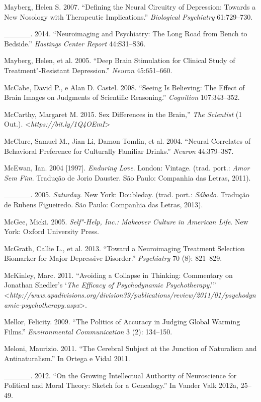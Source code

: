{\begin{Parskip}
Mayberg, Helen S. 2007. ``Defining the Neural Circuitry of Depression:
Towards a New Nosology with Therapeutic Implications.'' \emph{Biological
Psychiatry} 61:729--730.

\_\_\_\_\_. 2014. ``Neuroimaging and Psychiatry: The Long Road from Bench
to Bedside.'' \emph{Hastings Center Report} 44:S31--S36.

Mayberg, Helen, et al. 2005. ``Deep Brain Stimulation for Clinical Study
of Treatment"-Resistant Depression.'' \emph{Neuron} 45:651--660.

McCabe, David P., e Alan D. Castel. 2008. ``Seeing Is Believing: The
Effect of Brain Images on Judgments of Scientific Reasoning.''
\emph{Cognition} 107:343--352.

McCarthy, Margaret M. 2015. Sex Differences in the Brain,'' \emph{The
Scientist} (1 Out.).
\textless{}\emph{https://bit.ly/1Q4OEmI}\textgreater{}

McClure, Samuel M., Jian Li, Damon Tomlin, et al. 2004. ``Neural
Correlates of Behavioral Preference for Culturally Familiar Drinks.''
\emph{Neuron} 44:379--387.

McEwan, Ian. 2004 {[}1997{]}. \emph{Enduring Love}. London: Vintage.
(trad. port.: \emph{Amor Sem Fim}. Tradução de Jorio Dauster. São Paulo:
Companhia das Letras, 2011).

\_\_\_\_\_. 2005. \emph{Saturday}. New York: Doubleday. (trad. port.:
\emph{Sábado}. Tradução de Rubens Figueiredo. São Paulo: Companhia das
Letras, 2013).

McGee, Micki. 2005. \emph{Self"-Help, Inc.: Makeover Culture in American
Life}. New York: Oxford University Press.

McGrath, Callie L., et al. 2013. ``Toward a Neuroimaging Treatment
Selection Biomarker for Major Depressive Disorder.'' \emph{
Psychiatry} 70 (8): 821--829.

McKinley, Marc. 2011. ``Avoiding a Collapse in Thinking: Commentary on
Jonathan Shedler's `\emph{The Efficacy of Psychodynamic
Psychotherapy}.'''
\textless{}\emph{http://www.apadivisions.org/division39/publications/review/2011/01/psychodynamic-psychotherapy.aspx}\textgreater{}.

Mellor, Felicity. 2009. ``The Politics of Accuracy in Judging Global
Warming Films.'' \emph{Environmental Communication} 3 (2): 134--150.

Meloni, Maurizio. 2011. ``The Cerebral Subject at the Junction of
Naturalism and Antinaturalism.'' In Ortega e Vidal 2011.

\_\_\_\_\_. 2012. ``On the Growing Intellectual Authority of Neuroscience
for Political and Moral Theory: Sketch for a Genealogy.'' In Vander Valk
2012a, 25--49.


\end{Parskip}}
